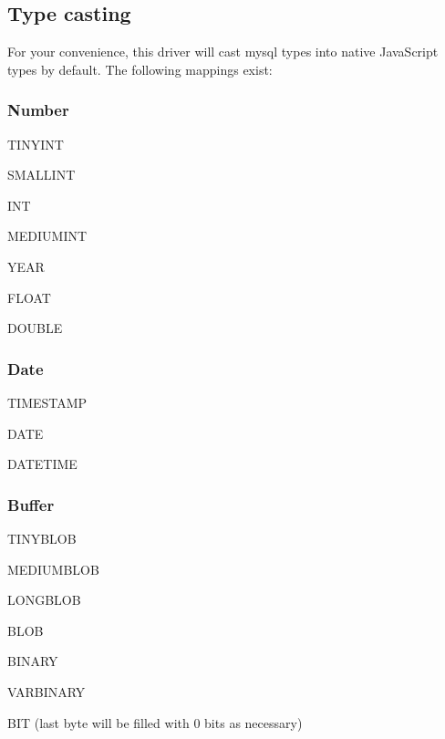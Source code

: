 \subsection*{Type casting}

For your convenience, this driver will cast mysql types into native Java\+Script types by default. The following mappings exist\+:

\subsubsection*{Number}


\begin{DoxyItemize}
\item T\+I\+N\+Y\+I\+N\+T
\item S\+M\+A\+L\+L\+I\+N\+T
\item I\+N\+T
\item M\+E\+D\+I\+U\+M\+I\+N\+T
\item Y\+E\+A\+R
\item F\+L\+O\+A\+T
\item D\+O\+U\+B\+L\+E
\end{DoxyItemize}

\subsubsection*{Date}


\begin{DoxyItemize}
\item T\+I\+M\+E\+S\+T\+A\+M\+P
\item D\+A\+T\+E
\item D\+A\+T\+E\+T\+I\+M\+E
\end{DoxyItemize}

\subsubsection*{Buffer}


\begin{DoxyItemize}
\item T\+I\+N\+Y\+B\+L\+O\+B
\item M\+E\+D\+I\+U\+M\+B\+L\+O\+B
\item L\+O\+N\+G\+B\+L\+O\+B
\item B\+L\+O\+B
\item B\+I\+N\+A\+R\+Y
\item V\+A\+R\+B\+I\+N\+A\+R\+Y
\item B\+I\+T (last byte will be filled with 0 bits as necessary)
\end{DoxyItemize}

